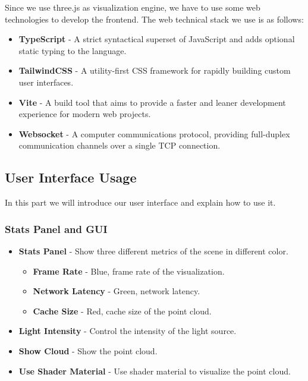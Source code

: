 \documentclass[11pt, a4paper,oneside,chapterprefix=false]{scrbook}
\begin{document}
Since we use three.js as visualization engine, we have to use some web technologies to develop the frontend. The web technical stack we use is as follows: 

\begin{itemize}
	\item \textbf{TypeScript} - A strict syntactical superset of JavaScript and adds optional static typing to the language.
	\item \textbf{TailwindCSS} - A utility-first CSS framework for rapidly building custom user interfaces.
	\item \textbf{Vite} - A build tool that aims to provide a faster and leaner development experience for modern web projects.
	\item \textbf{Websocket} - A computer communications protocol, providing full-duplex communication channels over a single TCP connection.
\end{itemize}

\subsection{User Interface Usage}

In this part we will introduce our user interface and explain how to use it.

\subsubsection{Stats Panel and GUI}

\begin{itemize}
	\item \textbf{Stats Panel} - Show three different metrics of the scene in different color.
		\begin{itemize}
			\item \textbf{Frame Rate} - Blue, frame rate of the visualization.
			\item \textbf{Network Latency} - Green, network latency.
			\item \textbf{Cache Size} - Red, cache size of the point cloud.
		\end{itemize}
	\item \textbf{Light Intensity} - Control the intensity of the light source.
	\item \textbf{Show Cloud} - Show the point cloud.
	\item \textbf{Use Shader Material} - Use shader material to visualize the point cloud.
\end {itemize}	
\end{document}
